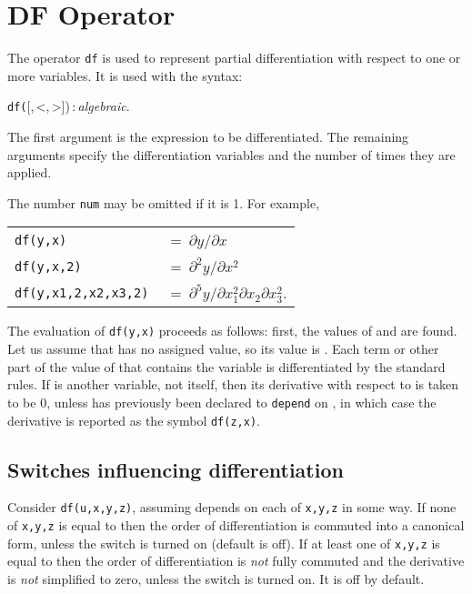 \section{DF Operator}
\label{sec:DF-operator}
\hypertarget{operator:DF}{}
The operator \texttt{df} is used to represent partial
differentiation with respect
to one or more variables. It is used with the syntax:
\begin{syntax}
  \texttt{df(}[,\,<,\,>])\,:\,\textit{algebraic}.
\end{syntax}
The first argument is the expression to be differentiated. The remaining
arguments specify the differentiation variables and the number of times
they are applied.

The number \texttt{num} may be omitted if it is 1.  For example,
\begin{flushleft}
  \hspace{0.5in}%
  \begin{tabular}{@{}l@{}l}
    \texttt{df(y,x)}            & ~=~$\partial y/\partial x$ \\
    \texttt{df(y,x,2)}          & ~=~$\partial^{2}y/\partial x^{2}$ \\
    \texttt{df(y,x1,2,x2,x3,2)} & ~=~$\partial^{5}y/\partial x_{1}^{2}
    \partial x_{2}\partial x_{3}^{2}$.
  \end{tabular}
\end{flushleft}

The evaluation of \texttt{df(y,x)} proceeds as follows: first, the values of
 and  are found.  Let us assume that  has no assigned
value, so its value is .  Each term or other part of the value of
 that contains the variable  is differentiated by the
standard rules.  If  is another variable, not  itself, then
its derivative with respect to  is taken to be 0, unless 
has previously been declared to \texttt{depend} on , in which
case the derivative is reported as the symbol \texttt{df(z,x)}.


\subsection{Switches influencing differentiation}
\hypertarget{switch:COMMUTEDF}{}
\hypertarget{switch:NOCOMMUTEDF}{}
\hypertarget{switch:SIMPNONCOMDF}{}

Consider \texttt{df(u,x,y,z)}, assuming  depends on each of \texttt{x,y,z}
in some way.  If none of \texttt{x,y,z} is equal to 
then the order of differentiation is commuted into a canonical form, unless the
switch  is turned on (default is off).
If at least one of \texttt{x,y,z} is equal to  then the order of
differentiation is \emph{not} fully commuted and the derivative is \emph{not}
simplified
to zero, unless the switch  is turned on.
It is off by default.

